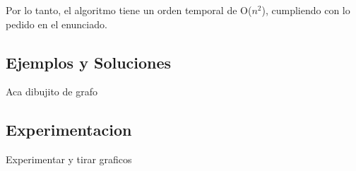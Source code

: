 Por lo tanto, el algoritmo tiene un orden temporal de O($n^2$), cumpliendo con lo pedido en el enunciado.

\subsection{Ejemplos y Soluciones}

Aca dibujito de grafo

\subsection{Experimentacion}

Experimentar y tirar graficos